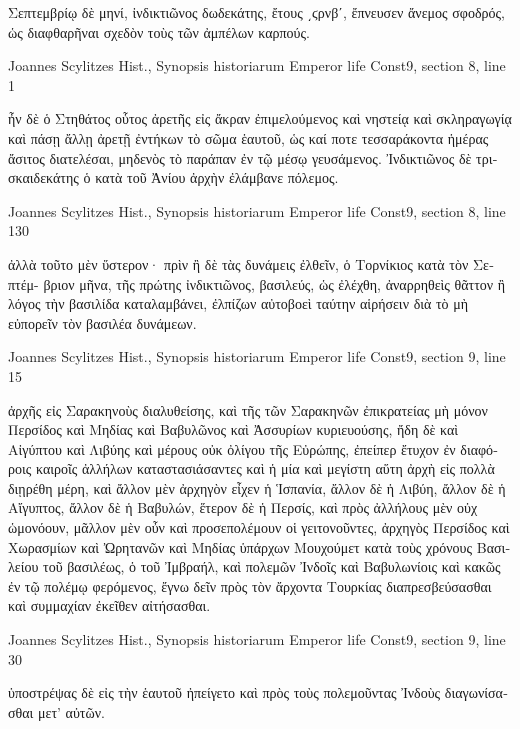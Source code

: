 \documentclass[12pt,letterpaper,twoside,final]{memoir}
\begin{document}
\begin{greek}
Σεπτεμβρίῳ δὲ μηνί, ἰνδικτιῶνος δωδεκάτης, ἔτους ͵ϛρνβʹ, ἔπνευσεν 
ἄνεμος σφοδρός, ὡς διαφθαρῆναι σχεδὸν τοὺς τῶν ἀμπέλων καρπούς. 



Joannes Scylitzes Hist., Synopsis historiarum 
Emperor life Const9, section 8, line 1

                                                ἦν δὲ ὁ Στηθάτος οὗτος ἀρετῆς εἰς ἄκραν 
ἐπιμελούμενος καὶ νηστείᾳ καὶ σκληραγωγίᾳ καὶ πάσῃ ἄλλῃ ἀρετῇ ἐντήκων τὸ σῶμα 
ἑαυτοῦ, ὡς καί ποτε τεσσαράκοντα ἡμέρας ἄσιτος διατελέσαι, μηδενὸς τὸ παράπαν ἐν 
τῷ μέσῳ γευσάμενος.   
Ἰνδικτιῶνος δὲ τρισκαιδεκάτης ὁ κατὰ τοῦ Ἀνίου ἀρχὴν ἐλάμβανε 
πόλεμος. 



Joannes Scylitzes Hist., Synopsis historiarum 
Emperor life Const9, section 8, line 130

                                                                ἀλλὰ τοῦτο 
μὲν ὕστερον· πρὶν ἢ δὲ τὰς δυνάμεις ἐλθεῖν, ὁ Τορνίκιος κατὰ τὸν Σεπτέμ-
βριον μῆνα, τῆς πρώτης ἰνδικτιῶνος, βασιλεύς, ὡς ἐλέχθη, ἀναρρηθεὶς 
θᾶττον ἢ λόγος τὴν βασιλίδα καταλαμβάνει, ἐλπίζων αὐτοβοεὶ ταύτην 
αἱρήσειν διὰ τὸ μὴ εὐπορεῖν τὸν βασιλέα δυνάμεων. 



Joannes Scylitzes Hist., Synopsis historiarum 
Emperor life Const9, section 9, line 15

ἀρχῆς εἰς Σαρακηνοὺς διαλυθείσης, καὶ τῆς τῶν Σαρακηνῶν ἐπικρατείας 
μὴ μόνον Περσίδος καὶ Μηδίας καὶ Βαβυλῶνος καὶ Ἀσσυρίων κυριευούσης, 
ἤδη δὲ καὶ Αἰγύπτου καὶ Λιβύης καὶ μέρους οὐκ ὀλίγου τῆς Εὐρώπης, 
ἐπείπερ ἔτυχον ἐν διαφόροις καιροῖς ἀλλήλων καταστασιάσαντες καὶ ἡ 
μία καὶ μεγίστη αὕτη ἀρχὴ εἰς πολλὰ διῃρέθη μέρη, καὶ ἄλλον μὲν ἀρχηγὸν 
εἶχεν ἡ Ἱσπανία, ἄλλον δὲ ἡ Λιβύη, ἄλλον δὲ ἡ Αἴγυπτος, ἄλλον δὲ ἡ   
Βαβυλών, ἕτερον δὲ ἡ Περσίς, καὶ πρὸς ἀλλήλους μὲν οὐχ ὡμονόουν, 
μᾶλλον μὲν οὖν καὶ προσεπολέμουν οἱ γειτονοῦντες, ἀρχηγὸς Περσίδος 
καὶ Χωρασμίων καὶ Ὠρητανῶν καὶ Μηδίας ὑπάρχων Μουχούμετ κατὰ 
τοὺς χρόνους Βασιλείου τοῦ βασιλέως, ὁ τοῦ Ἰμβραήλ, καὶ πολεμῶν 
Ἰνδοῖς καὶ Βαβυλωνίοις καὶ κακῶς ἐν τῷ πολέμῳ φερόμενος, ἔγνω δεῖν 
πρὸς τὸν ἄρχοντα Τουρκίας διαπρεσβεύσασθαι καὶ συμμαχίαν ἐκεῖθεν 
αἰτήσασθαι. 



Joannes Scylitzes Hist., Synopsis historiarum 
Emperor life Const9, section 9, line 30

                                                     ὑποστρέψας δὲ εἰς 
τὴν ἑαυτοῦ ἠπείγετο καὶ πρὸς τοὺς πολεμοῦντας Ἰνδοὺς διαγωνίσασθαι 
μετ' αὐτῶν. 




\end{greek}
\end{document}
